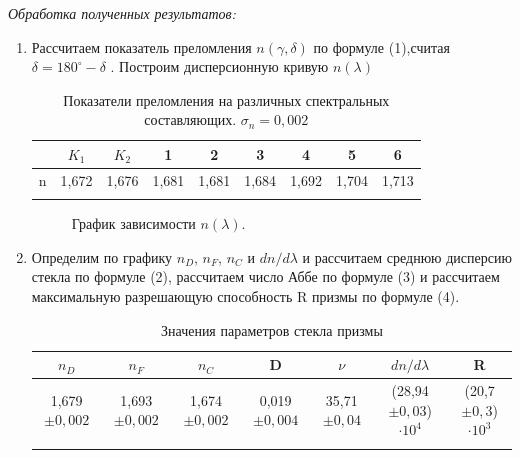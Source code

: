 \documentclass[a4paper, 12pt]{article}%
\newcommand{\RomanNumeralCaps}[1]{\uppercase\expandafter{\romannumeral#1}}
\begin{document}
	\newpage
	
	\RomanNumeralCaps 3 \textit{Обработка полученных результатов: } \\
	\begin{enumerate}
	\item Рассчитаем показатель преломления $n(\gamma,\delta)$ по формуле (1),считая $\delta = 180^\circ - \delta$ . Построим дисперсионную кривую $n(\lambda)$
	
	\begin{longtable}{|c|c|c|c|c|c|c|c|c|}
		\hline
		 &$K_1$ & $K_2$ & 1 & 2 & 3 & 4 & 5 & 6 \\ \hline
		n &1,672 & 1,676 & 1,681 & 1,681 & 1,684 & 1,692 & 1,704 & 1,713 \\ \hline
		\caption{Показатели преломления на различных спектральных составляющих. $\sigma_n = 0,002$}
	\end{longtable}

	\begin{figure}[H]
		\caption{График зависимости $n(\lambda)$.}
	\end{figure}

	\newpage
	
	\item Определим по графику	$n_D$, $n_F$, $n_C$ и $dn/d\lambda$ и рассчитаем среднюю дисперсию стекла по формуле (2), рассчитаем число Аббе по формуле (3) и рассчитаем максимальную разрешающую
	способность R призмы по формуле (4).
	
	\begin{longtable}{|c|c|c|c|c|c|c|}
		\hline
		$n_D$ & $n_F$ & $n_C$ & D & $\nu$ & $dn/d\lambda$ & R  \\ \hline
		1,679$\pm 0,002$ & 1,693$\pm 0,002$ & 1,674$\pm 0,002$ & 0,019$\pm 0,004$ & 35,71$\pm 0,04$& (28,94$\pm 0,03$)$\cdot 10^4$ & (20,7$\pm 0,3$)$\cdot 10^3$\\ \hline
		\caption{Значения параметров стекла призмы}
	\end{longtable}
	
	\end{enumerate}
	
\end{document}

